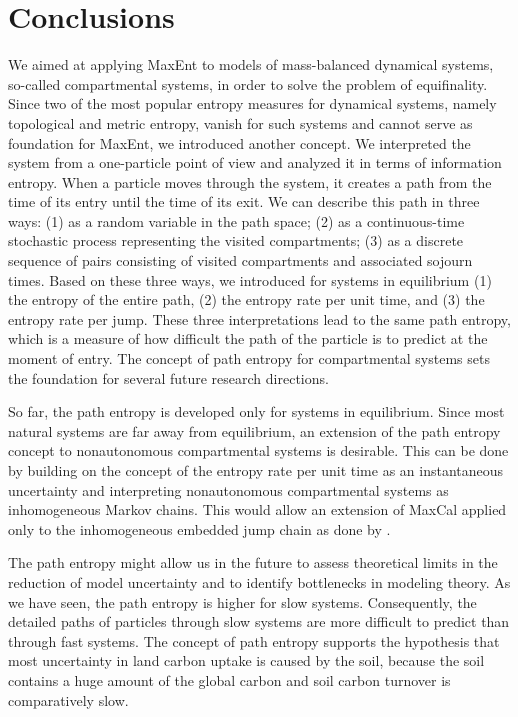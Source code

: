 \documentclass[smallextended]{svjour3}
\begin{document}
\section{Conclusions}
We aimed at applying MaxEnt to models of mass-balanced dynamical systems, so-called compartmental systems, in order to solve the problem of equifinality.
Since two of the most popular entropy measures for dynamical systems, namely topological and metric entropy, vanish for such systems and cannot serve as foundation for MaxEnt, we introduced another concept.
We interpreted the system from a one-particle point of view and analyzed it in terms of information entropy.
When a particle moves through the system, it creates a path from the time of its entry until the time of its exit.
We can describe this path in three ways: (1) as a random variable in the path space; (2) as a continuous-time stochastic process representing the visited compartments; (3) as a discrete sequence of pairs consisting of visited compartments and associated sojourn times. 
Based on these three ways, we introduced for systems in equilibrium (1) the entropy of the entire path, (2) the entropy rate per unit time, and (3) the entropy rate per jump. 
These three interpretations lead to the same path entropy, which is a measure of how difficult the path of the particle is to predict at the moment of entry.
The concept of path entropy for compartmental systems sets the foundation for several future research directions.

So far, the path entropy is developed only for systems in equilibrium.
Since most natural systems are far away from equilibrium, an extension of the path entropy concept to nonautonomous compartmental systems is desirable.
This can be done by building on the concept of the entropy rate per unit time as an instantaneous uncertainty and interpreting nonautonomous compartmental systems as inhomogeneous Markov chains.
This would allow an extension of MaxCal applied only to the inhomogeneous embedded jump chain as done by \citet{Ge2012JCP}.

The path entropy might allow us in the future to assess theoretical limits in the reduction of model uncertainty and to identify bottlenecks in modeling theory.
As we have seen, the path entropy is higher for slow systems.
Consequently, the detailed paths of particles through slow systems are more difficult to predict than through fast systems.
The concept of path entropy supports the hypothesis that most uncertainty in land carbon uptake \citep{Friedlingstein2006JC, Friedlingstein2013JC} is caused by the soil, 
because the soil contains a huge amount of the global carbon and soil carbon turnover is comparatively slow.
\end{document}
